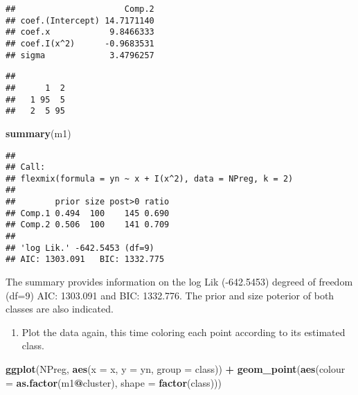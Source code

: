 \documentclass[]{article}
\newenvironment{Shaded}{\begin{snugshade}}{\end{snugshade}}
\newcommand{\CommentTok}[1]{\textcolor[rgb]{0.56,0.35,0.01}{\textit{#1}}}
\newcommand{\DataTypeTok}[1]{\textcolor[rgb]{0.13,0.29,0.53}{#1}}
\newcommand{\KeywordTok}[1]{\textcolor[rgb]{0.13,0.29,0.53}{\textbf{#1}}}
\newcommand{\NormalTok}[1]{#1}
\newcommand{\OperatorTok}[1]{\textcolor[rgb]{0.81,0.36,0.00}{\textbf{#1}}}
\newcommand{\StringTok}[1]{\textcolor[rgb]{0.31,0.60,0.02}{#1}}
\providecommand{\tightlist}{%
  \setlength{\itemsep}{0pt}\setlength{\parskip}{0pt}}
\begin{document}
\begin{verbatim}
##                      Comp.2
## coef.(Intercept) 14.7171140
## coef.x            9.8466333
## coef.I(x^2)      -0.9683531
## sigma             3.4796257
\end{verbatim}

\begin{Shaded}
\end{Shaded}

\begin{verbatim}
##    
##      1  2
##   1 95  5
##   2  5 95
\end{verbatim}

\begin{Shaded}
\begin{Highlighting}[]
\KeywordTok{summary}\NormalTok{(m1)}
\end{Highlighting}
\end{Shaded}

\begin{verbatim}
## 
## Call:
## flexmix(formula = yn ~ x + I(x^2), data = NPreg, k = 2)
## 
##        prior size post>0 ratio
## Comp.1 0.494  100    145 0.690
## Comp.2 0.506  100    141 0.709
## 
## 'log Lik.' -642.5453 (df=9)
## AIC: 1303.091   BIC: 1332.775
\end{verbatim}

The summary provides information on the log Lik (-642.5453) degreed of
freedom (df=9) AIC: 1303.091 and BIC: 1332.776. The prior and size
poterior of both classes are also indicated.

\begin{enumerate}
\def\labelenumi{\alph{enumi}.}
\setcounter{enumi}{3}
\tightlist
\item
  Plot the data again, this time coloring each point according to its
  estimated class.
\end{enumerate}

\begin{Shaded}
\begin{Highlighting}[]
\KeywordTok{ggplot}\NormalTok{(NPreg, }\KeywordTok{aes}\NormalTok{(}\DataTypeTok{x =}\NormalTok{ x, }\DataTypeTok{y =}\NormalTok{ yn, }\DataTypeTok{group =}\NormalTok{ class)) }\OperatorTok{+}
\StringTok{   }\KeywordTok{geom_point}\NormalTok{(}\KeywordTok{aes}\NormalTok{(}\DataTypeTok{colour =} \KeywordTok{as.factor}\NormalTok{(m1}\OperatorTok{@}\NormalTok{cluster), }\DataTypeTok{shape =} \KeywordTok{factor}\NormalTok{(class)))}
\end{Highlighting}
\end{Shaded}
\end{document}
